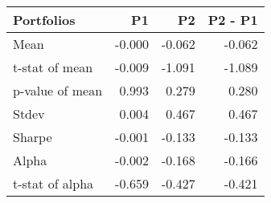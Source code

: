 \begin{tabular}{lrrr}
\toprule
Portfolios & P1 & P2 & P2 - P1 \\
\midrule
Mean & -0.000 & -0.062 & -0.062 \\
t-stat of mean & -0.009 & -1.091 & -1.089 \\
p-value of mean & 0.993 & 0.279 & 0.280 \\
Stdev & 0.004 & 0.467 & 0.467 \\
Sharpe & -0.001 & -0.133 & -0.133 \\
Alpha & -0.002 & -0.168 & -0.166 \\
t-stat of alpha & -0.659 & -0.427 & -0.421 \\
\bottomrule
\end{tabular}

